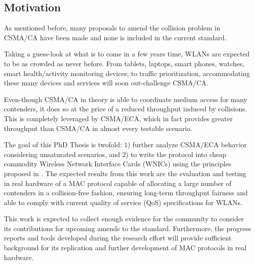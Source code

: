\subsection{Motivation}\label{motivation}
As mentioned before, many proposals to amend the collision problem in CSMA/CA have been made and none is included in the current standard.

Taking a guess-look at what is to come in a few years time, WLANs are expected to be as crowded as never before. From tablets, laptops, smart phones, watches, smart health/activity monitoring devices; to traffic prioritization, accommodating these many devices and services will soon out-challenge CSMA/CA.

Even-though CSMA/CA in theory is able to coordinate medium access for many contenders, it does so at the price of a reduced throughput induced by collisions. This is completely leveraged by CSMA/ECA, which in fact provides greater throughput than CSMA/CA in almost every testable scenario.

The goal of this PhD Thesis is twofold: $1$) further analyze CSMA/ECA behavior considering unsaturated scenarios, and $2$) to write the protocol into cheap commodity Wireless Network Interface Cards (WNICs) using the principles proposed in \cite{WMP}. The expected results from this work are the evaluation and testing in real hardware of a MAC protocol capable of allocating a large number of contenders in a collision-free fashion, ensuring long-term throughput fairness and able to comply with current quality of service (QoS) specifications for WLANs. 

This work is expected to collect enough evidence for the community to consider its contributions for upcoming amends to the standard. Furthermore, the progress reports and tools developed during the research effort will provide sufficient background for its replication and further development of MAC protocols in real hardware.



